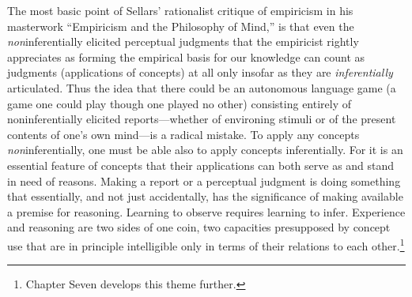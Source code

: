 The most basic point of Sellars' rationalist critique of empiricism in
his masterwork ``Empiricism and the Philosophy of Mind,'' is that even
the \emph{non}inferentially elicited perceptual judgments that the
empiricist rightly appreciates as forming the empirical basis for our
knowledge can count as judgments (applications of concepts) at all only
insofar as they are \emph{inferentially} articulated. Thus the idea that
there could be an autonomous language game (a game one could play though
one played no other) consisting entirely of noninferentially elicited
reports---whether of environing stimuli or of the present contents of
one's own mind---is a radical mistake. To apply any concepts
\emph{non}inferentially, one must be able also to apply concepts
inferentially. For it is an essential feature of concepts that their
applications can both serve as and stand in need of reasons. Making a
report or a perceptual judgment is doing something that essentially, and
not just accidentally, has the significance of making available a
premise for reasoning. Learning to observe requires learning to infer.
Experience and reasoning are two sides of one coin, two capacities
presupposed by concept use that are in principle intelligible only in
terms of their relations to each other.\footnote{Chapter Seven develops
  this theme further.}

